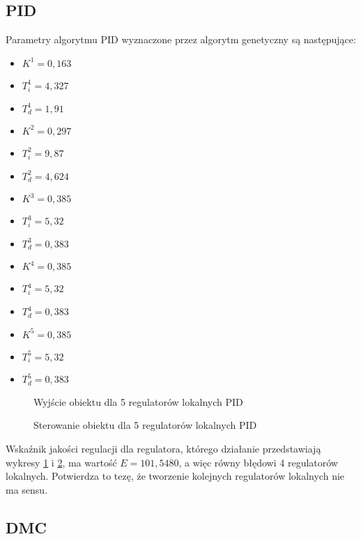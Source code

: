 \subsection{PID}
Parametry algorytmu PID wyznaczone przez algorytm genetyczny są następujące:
\begin{itemize}
\item $K^1 = 0,163$
\item $T^1_i = 4,327$
\item $T^1_d = 1,91$
\\
\item $K^2 = 0,297$
\item $T^2_i = 9,87$
\item $T^2_d = 4,624$
\\
\item $K^3 = 0,385$
\item $T^3_i = 5,32$
\item $T^3_d = 0,383$
\\
\item $K^4 = 0,385$
\item $T^4_i = 5,32$
\item $T^4_d = 0,383$
\\
\item $K^5 = 0,385$
\item $T^5_i = 5,32$
\item $T^5_d = 0,383$
\end{itemize}

\begin{figure}[H]
\centering
{}
\caption{Wyjście obiektu dla 5 regulatorów lokalnych PID}
\label{fig:5_reg_pid_y}
\end{figure}

\begin{figure}[H]
\centering
{}
\caption{Sterowanie obiektu dla 5 regulatorów lokalnych PID}
\label{fig:5_reg_pid_u}
\end{figure}

Wskaźnik jakości regulacji dla regulatora, którego działanie przedstawiają wykresy \ref{fig:5_reg_pid_y} i \ref{fig:5_reg_pid_u}, ma wartość $E=101,5480$, a więc równy błędowi 4 regulatorów lokalnych. Potwierdza to tezę, że tworzenie kolejnych regulatorów lokalnych nie ma sensu.
\subsection{DMC}